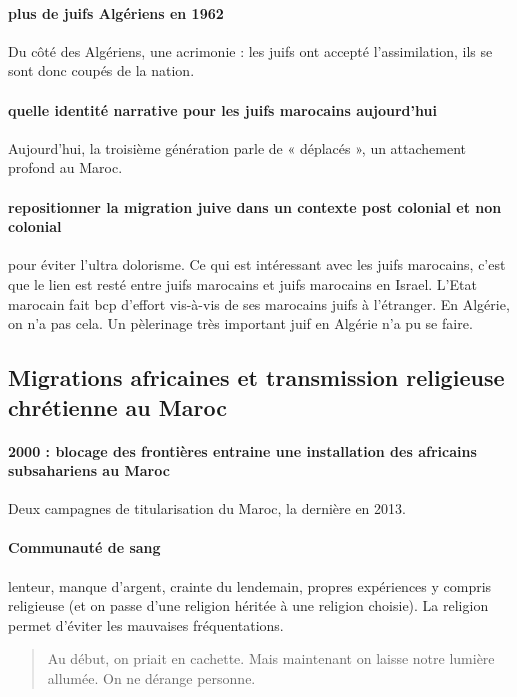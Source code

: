 \paragraph{plus de juifs Algériens en 1962}  Du côté des Algériens, une acrimonie : les juifs ont accepté l’assimilation, ils se sont donc coupés de la nation. 

\paragraph{quelle identité narrative pour les juifs marocains aujourd’hui} Aujourd’hui, la troisième génération parle de « déplacés », un attachement profond au Maroc.
\paragraph{repositionner la migration juive dans un contexte post colonial et non colonial} pour éviter l’ultra dolorisme. Ce qui est intéressant avec les juifs marocains, c’est que le lien est resté entre juifs marocains et juifs marocains en Israel. L’Etat marocain fait bcp d’effort vis-à-vis de ses marocains juifs à l’étranger. En Algérie, on n’a pas cela. Un pèlerinage très important juif en Algérie n’a pu se faire. 

\subsection{Migrations africaines et transmission religieuse chrétienne au Maroc}

\paragraph{2000 : blocage des frontières entraine une installation des africains subsahariens au Maroc} Deux campagnes de titularisation du Maroc, la dernière en 2013. 
\paragraph{Communauté de sang} lenteur, manque d’argent, crainte du lendemain, propres expériences y compris religieuse (et on passe d’une religion héritée à une religion choisie). 
La religion permet d’éviter les mauvaises fréquentations. 
\begin{quote}
Au début, on priait en cachette. Mais maintenant on laisse notre lumière allumée. On ne dérange personne. 
\end{quote}

